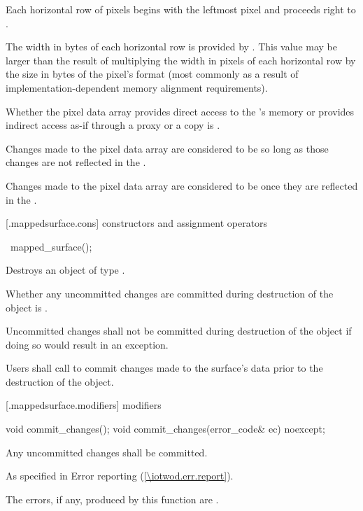 \pnum
Each horizontal row of pixels begins with the leftmost pixel and proceeds right to .

\pnum
The width in bytes of each horizontal row is provided by . This value may be larger than the result of multiplying the width in pixels of each horizontal row by the size in bytes of the pixel's format (most commonly as a result of implementation-dependent memory alignment requirements).

\pnum
Whether the pixel data array provides direct access to the \underlyingsurface's memory or provides indirect access as-if through a proxy or a copy is \unspecnorm.

\pnum
Changes made to the pixel data array are considered to be  so long as those changes are not reflected in the \underlyingsurface.

\pnum
Changes made to the pixel data array are considered to be  once they are reflected in the \underlyingsurface.

 [\iotwod.mappedsurface.cons] { constructors and assignment operators}

\begin{itemdecl}
~mapped_surface();
\end{itemdecl}
\begin{itemdescr}
\pnum
\effects
Destroys an object of type . 

\pnum
\remarks
Whether any uncommitted changes are committed during destruction of the  object is \unspecnorm.

\pnum
Uncommitted changes shall not be committed during destruction of the  object if doing so would result in an exception.

\pnum
Users shall call  to commit changes made to the surface's data prior to the destruction of the  object.
\end{itemdescr}

 [\iotwod.mappedsurface.modifiers]{ modifiers}

\begin{itemdecl}
void commit_changes();
void commit_changes(error_code& ec) noexcept;
\end{itemdecl}
\begin{itemdescr}
\pnum
\effects
Any uncommitted changes shall be committed.

\pnum
\throws
As specified in Error reporting (\ref{\iotwod.err.report}).

\pnum
\errors
The errors, if any, produced by this function are .
\end{itemdescr}

